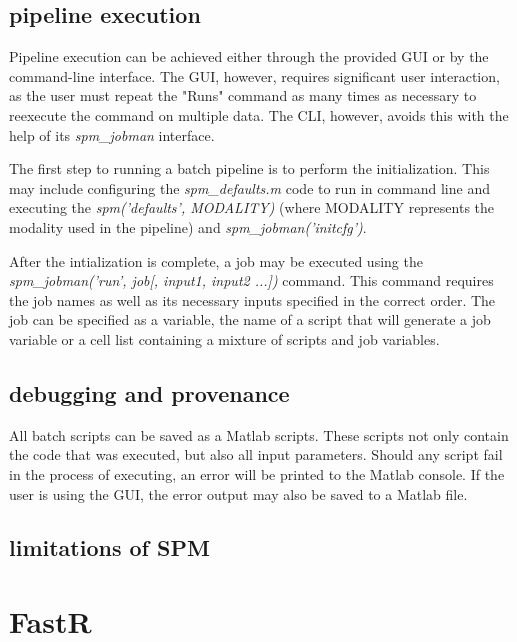 \documentclass{report}
\begin{document}
        \subsection{pipeline execution}
        Pipeline execution can be achieved either through the provided GUI or by
the command-line interface. The GUI, however, requires significant user
interaction, as the user must repeat the "Runs" command as many times as
necessary to reexecute the command on multiple data. The CLI, however, avoids
this with the help of its \textit{spm\_jobman} interface.

        The first step to running a batch pipeline is to perform the
initialization. This may include configuring the \textit{spm\_defaults.m} code
to run in command line and executing the \textit{spm(’defaults’, MODALITY)}
(where MODALITY represents the modality used in the pipeline) and
\textit{spm\_jobman(’initcfg’)}.

        After the intialization is complete, a job may be executed using the
\textit{spm\_jobman(’run’, job[, input1, input2 ...])} command. This command
requires the job names as well as its necessary inputs specified in the correct
order. The job can be specified as a variable, the name of a script that will
generate a job variable or a cell list containing a mixture of scripts and job
variables. 
         
        \subsection{debugging and provenance}
        All batch scripts can be saved as a Matlab scripts. These scripts not
only contain the code that was executed, but also all input parameters. Should
any script fail in the process of executing, an error will be printed to the
Matlab console. If the user is using the GUI, the error output may also be saved
to a Matlab file.
    
        \subsection{limitations of SPM}
    

    \section{FastR}
\end{document}
